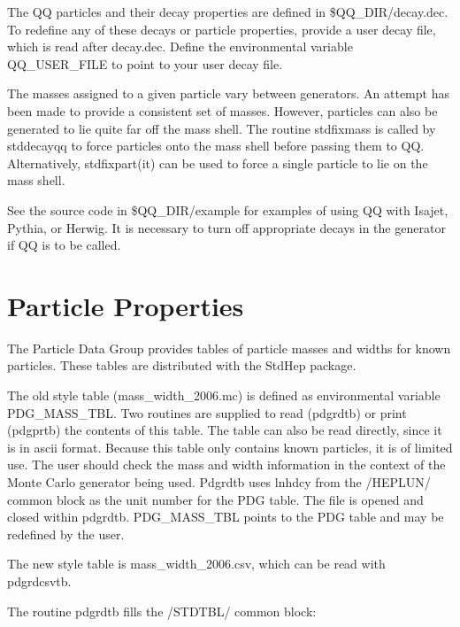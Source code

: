 The QQ particles and their decay properties are defined in \$QQ\_DIR/decay.dec.
To redefine any of these decays or particle properties, provide a user
decay file, which is read after decay.dec.  Define the environmental
variable QQ\_USER\_FILE to point to your user decay file.

The masses assigned to a given particle vary between generators.
An attempt has been made to provide a consistent set of masses.
However, particles can also be generated to lie quite far off the mass shell.
The routine stdfixmass is called by stddecayqq to force particles
onto the mass shell before passing them to QQ.  Alternatively,
stdfixpart(it) can be used to force a single particle to lie on
the mass shell.

See the source code in \$QQ\_DIR/example for examples of using QQ with
Isajet, Pythia, or Herwig.  It is necessary to turn off appropriate decays in
the generator if QQ is to be called.

\section { Particle Properties }

The Particle Data Group provides tables of particle masses and widths
for known particles.
These tables are distributed with the StdHep package.


The old style table (mass\_width\_2006.mc) is
defined as environmental variable PDG\_MASS\_TBL.
Two routines are supplied to read (pdgrdtb) or print (pdgprtb) the
contents of this table.  The table can also be read directly, since it
is in ascii format.  Because this table only contains known particles,
it is of limited use.  The user should check the mass and width information
in the context of the Monte Carlo generator being used.  Pdgrdtb uses
lnhdcy from the /HEPLUN/ common block as the unit number for the PDG table.
The file is opened and closed within pdgrdtb.  PDG\_MASS\_TBL points
to the PDG table and may be redefined by the user.

The new style table is mass\_width\_2006.csv, which can be read with pdgrdcsvtb.

\noindent The routine pdgrdtb fills the /STDTBL/ common block:

